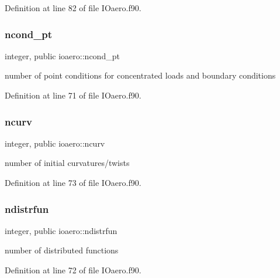 Definition at line 82 of file I\+Oaero.\+f90.

\mbox{\label{namespaceioaero_a5ffc5d3578d9abad99d3736ba352e07d}} 
\subsubsection{\texorpdfstring{ncond\+\_\+pt}{ncond\_pt}}
{\footnotesize\ttfamily integer, public ioaero\+::ncond\+\_\+pt}



number of point conditions for concentrated loads and boundary conditions 



Definition at line 71 of file I\+Oaero.\+f90.

\mbox{\label{namespaceioaero_a34dabcb4bc1b4f260277297856ac3653}} 
\subsubsection{\texorpdfstring{ncurv}{ncurv}}
{\footnotesize\ttfamily integer, public ioaero\+::ncurv}



number of initial curvatures/twists 



Definition at line 73 of file I\+Oaero.\+f90.

\mbox{\label{namespaceioaero_a89e1f8f2d6913d23ef482a5788d2eba5}} 
\subsubsection{\texorpdfstring{ndistrfun}{ndistrfun}}
{\footnotesize\ttfamily integer, public ioaero\+::ndistrfun}



number of distributed functions 



Definition at line 72 of file I\+Oaero.\+f90.

\mbox{\label{namespaceioaero_a2b095b5cb5aab1f100d202c8004c9cb5}} 
